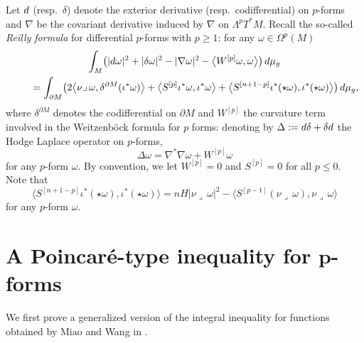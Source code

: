 \documentclass[11pt]{article}
\numberwithin{equation}{section}
\numberwithin{equation}{section}
\begin{document}
Let ${\rm d}$ (resp.\ $\delta$) denote the exterior derivative (resp.\ codifferential) on $p$-forms and $\nabla$ be the covariant derivative induced by $\nabla$ on $\Lambda^pT^*M$.
Recall the so-called \emph{Reilly formula} \cite[Theorem~3]{RaulotSavo11} for differential $p$-forms with $p\geq 1$: for any $\omega\in\Omega^p(M)$
\begin{gather}
\int_M\bigl(|{\rm d}\omega|^2+|\delta\omega|^2-|\nabla\omega|^2-\bigl\langle W^{[p]}\omega,\omega\bigr\rangle\bigr)\,{\rm d}\mu_g \nonumber\\
\qquad{} =\int_{\partial M}\bigl(2\bigl\langle\nu\lrcorner\,\omega,\delta^{\partial M}(\iota^*\omega)\bigr\rangle+\bigl\langle S^{[p]}\iota^*\omega,\iota^*\omega\bigr\rangle+\bigl\langle S^{[n+1-p]}\iota^*(\star\omega),\iota^*(\star\omega)\bigr\rangle\bigr)\,{\rm d}\mu_g,\label{eq:Reillyformula}
\end{gather}
where $\delta^{\partial M}$ denotes the codifferential on $\partial M$ and $W^{[p]}$ the curvature term involved in the Weitzenb\"ock formula for $p$ forms: denoting by $\Delta:={\rm d}\delta+\delta {\rm d}$ the Hodge Laplace operator on $p$-forms,
\[\Delta\omega=\nabla^*\nabla\omega+W^{[p]}\omega\]
for any $p$-form $\omega$.  By convention, we let $W^{[p]}=0$ and $S^{[p]}=0$ for all $p\leq 0$.
Note that \cite[Theorem 3]{RaulotSavo11}
\begin{equation*}%
\bigl\langle S^{[n+1-p]}\iota^*(\star\omega),\iota^*(\star\omega)\bigr\rangle=nH|\nu\lrcorner\,\omega|^2-\bigl\langle S^{[p-1]}(\nu\lrcorner\,\omega),\nu\lrcorner\,\omega\bigr\rangle
\end{equation*}
for any $p$-form $\omega$.

\section[A Poincar\'e-type inequality for p-forms]{A Poincar\'e-type inequality for $\boldsymbol p$-forms}\label{s:Poincareineqpformsgeneral}

We first prove a generalized version of the integral i\-ne\-qua\-li\-ty for functions obtained by Miao and Wang in \cite[equation~(1.3)]{MiaoWang14}.
\end{document}
